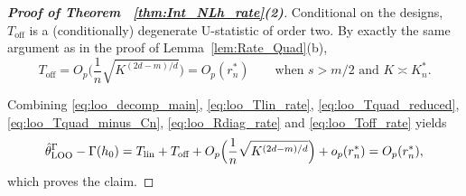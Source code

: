 \documentclass[12pt,american]{article}
\theoremstyle{definition}
\theoremstyle{plain}
\theoremstyle{definition}
\theoremstyle{plain}
\theoremstyle{plain}
\theoremstyle{plain}
\theoremstyle{plain}
\theoremstyle{plain}
\begin{document}
\begin{proof}[\textbf{Proof of Theorem ~\ref{thm:Int_NLh_rate}(2)}]
Conditional on the designs, $T_{\text{off}}$ is a (conditionally) degenerate U-statistic of order two.
By exactly the same argument as in the proof of Lemma~\ref{lem:Rate_Quad}(b),
\begin{equation}\label{eq:loo_Toff_rate}
T_{\text{off}}=O_p\Big(\frac{1}{n}\sqrt{K^{(2d-m)/d}}\Big)=O_p(r_n^*)\qquad\text{when $s>m/2$ and $K\asymp K_n^*$.}
\end{equation}

Combining \eqref{eq:loo_decomp_main}, \eqref{eq:loo_Tlin_rate}, \eqref{eq:loo_Tquad_reduced}, \eqref{eq:loo_Tquad_minus_Cn}, \eqref{eq:loo_Rdiag_rate} and \eqref{eq:loo_Toff_rate} yields
\[
\hat\theta^{\Gamma}_{\text{LOO}}-\Gamma(h_0)
= T_{\text{lin}}+T_{\text{off}}+O_p\Big(\frac{1}{n}\sqrt{K^{(2d-m)/d}}\Big)+o_p(r_n^*)
=O_p(r_n^*),
\]
which proves the claim.
\end{proof}
\end{document}
